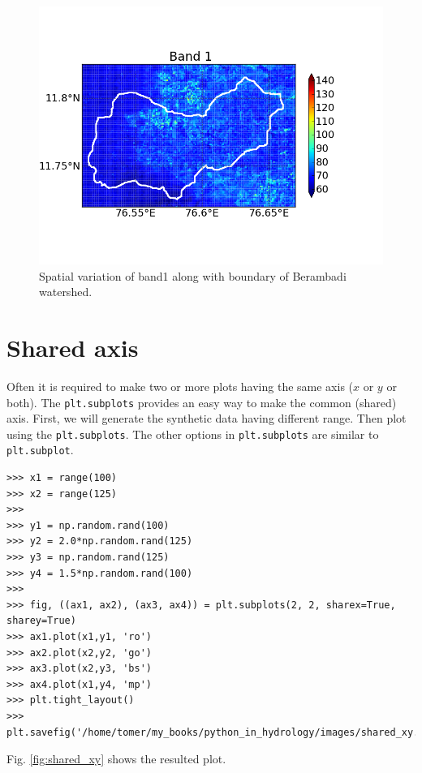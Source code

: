 \documentclass[10pt]{book}
\begin{document}
\beforefig
\begin{figure}[h!]
  \centering
    \includegraphics[scale=0.5]{images/basemap.png}
  \caption{Spatial variation of band1 along with boundary of Berambadi watershed.}
   \label{fig:basemap}
\end{figure}
\afterfig


\section{Shared axis}
Often it is required to make two or more plots having the same axis ($x$ or $y$ or both). The \verb"plt.subplots" provides an easy way to make the common (shared) axis. First, we will generate the synthetic data having different range. Then plot using the \verb"plt.subplots". The other options in \verb"plt.subplots" are similar to \verb"plt.subplot". 
\beforeverb \begin{verbatim}
>>> x1 = range(100)
>>> x2 = range(125)
>>> 
>>> y1 = np.random.rand(100)
>>> y2 = 2.0*np.random.rand(125)
>>> y3 = np.random.rand(125)
>>> y4 = 1.5*np.random.rand(100)
>>> 
>>> fig, ((ax1, ax2), (ax3, ax4)) = plt.subplots(2, 2, sharex=True, sharey=True)
>>> ax1.plot(x1,y1, 'ro')
>>> ax2.plot(x2,y2, 'go')
>>> ax3.plot(x2,y3, 'bs')
>>> ax4.plot(x1,y4, 'mp')
>>> plt.tight_layout()
>>> plt.savefig('/home/tomer/my_books/python_in_hydrology/images/shared_xy.png')
\end{verbatim} \afterverb
Fig. \ref{fig:shared_xy} shows the resulted plot.
\end{document}
